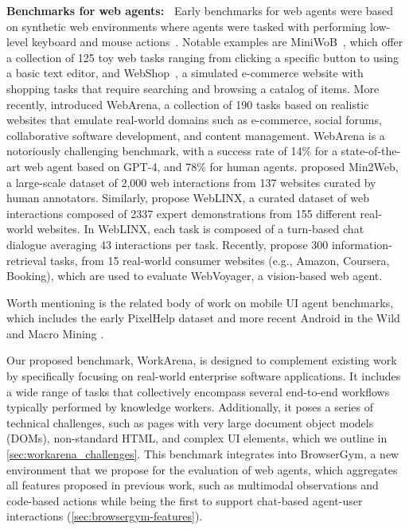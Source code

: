 \documentclass{article}
\theoremstyle{plain}
\theoremstyle{definition}
\theoremstyle{remark}
\newcommand{\paragraphtight}[1]{\textbf{#1~}}
\begin{document}
\paragraphtight{Benchmarks for web agents:}
Early benchmarks for web agents were based on synthetic web environments where agents were tasked with performing low-level keyboard and mouse actions~\citep{shi2017world}. Notable examples are MiniWoB~\citep{Shi2017MiniWoB, LiuL18MiniWoB}, which offer a collection of 125 toy web tasks ranging from clicking a specific button to using a basic text editor, and WebShop~\citep{yao2022webshop}, a simulated e-commerce website with shopping tasks that require searching and browsing a catalog of items. More recently, \citet{zhou2023webarena} introduced WebArena, a collection of 190 tasks based on realistic websites that emulate real-world domains such as e-commerce, social forums, collaborative software development, and content management. WebArena is a notoriously challenging benchmark, with a success rate of 14\% for a state-of-the-art web agent based on GPT-4, and 78\% for human agents.
\citet{deng2023mind2web} proposed Min2Web, a large-scale dataset of 2,000 web interactions from 137 websites curated by human annotators.
Similarly, \citet{lu2024weblinx} propose WebLINX, a curated dataset of web interactions composed of 2337 expert demonstrations from 155 different real-world websites. In WebLINX, each task is composed of a turn-based chat dialogue averaging 43 interactions per task. 
Recently, \citet{he2024webvoyager} propose 300 information-retrieval tasks, from 15 real-world consumer websites (e.g., Amazon, Coursera, Booking), which are used to evaluate WebVoyager, a vision-based web agent.

Worth mentioning is the related body of work on mobile UI agent benchmarks, which includes the early PixelHelp dataset \citep{seq2act} and more recent Android in the Wild \citep{aitw23} and Macro Mining \citep{macromining}.

Our proposed benchmark, WorkArena, is designed to complement existing work by specifically focusing on real-world enterprise software applications. It includes a wide range of tasks that collectively encompass several end-to-end workflows typically performed by knowledge workers.
Additionally, it poses a series of technical challenges, such as pages with very large document object models (DOMs), non-standard HTML, and complex UI elements, which we outline in \cref{sec:workarena_challenges}. This benchmark integrates into BrowserGym, a new environment that we propose for the evaluation of web agents, which aggregates all features proposed in previous work, such as multimodal observations and code-based actions while being the first to support chat-based agent-user interactions (\cref{sec:browsergym-features}).
\end{document}
